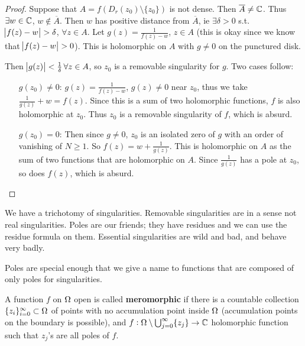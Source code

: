 \begin{proof}
Suppose that $A = f(D_r(z_0) \setminus \{ z_0 \})$ is not dense. Then $\overline{A} \neq \mathbb{C}$. Thus $\exists w \in \mathbb{C}$, $w \notin \overline{A} $. Then  $w$ has positive distance from $\overline{A}$, ie $\exists \delta >0$ s.t. $\abs{f(z) - w} > \delta$, $\forall z \in A$. Let $g(z) = \frac{1}{f(z) - w}$, $z \in A$ (this is okay since we know that $\abs{f(z) - w} > 0$). This is holomorphic on $A$ with $g \neq 0$ on the punctured disk.

Then $\abs{g(z)} < \frac{1}{\delta} \, \forall z \in A$, so $z_0$ is a removable singularity for $g$. Two cases follow:


\begin{enumerate}
    \item[$g(z_0) \neq 0$:] $g(z) = \frac{1}{f(z) - w}$, $g(z) \neq 0$ near $z_0$, thus we take $\frac{1}{g(z)} + w = f(z)$. Since this is a sum of two holomorphic functions, $f$ is also holomorphic at $z_0$. Thus $z_0$ is a removable singularity of $f$, which is absurd.
    \item[$g(z_0) = 0$:] Then since $g\neq 0$,  $z_0$ is an isolated zero of $g$ with an order of vanishing of $N \geq 1$. So $f(z) = w + \frac{1}{g(z)}$. This is holomorphic on $A$ as the sum of two functions that are holomorphic on $A$. Since $\frac{1}{g(z)}$ has a pole at $z_0$, so does $f(z)$, which is absurd.
\end{enumerate}





\end{proof}



\begin{remark}
We have a trichotomy of singularities. Removable singularities are in a sense not real singularities. Poles are our friends; they have residues and we can use the residue formula on them. Essential singularities are wild and bad, and behave very badly.
\end{remark}

Poles are special enough that we give a name to functions that are composed of only poles for singularities.


\begin{definition}
A function $f$ on $\Omega$ open is called \textbf{meromorphic} if there is a countable collection $\{ z_i \}_{i=0}^\infty \subset \Omega$ of points with no accumulation point inside $\Omega$ (accumulation points on the boundary is possible), and $f: \Omega \setminus \bigcup_{j=0}^\infty \{ z_j \} \to \mathbb{C} $ holomorphic function such that $z_j$'s are all poles of $f$.
\end{definition}



